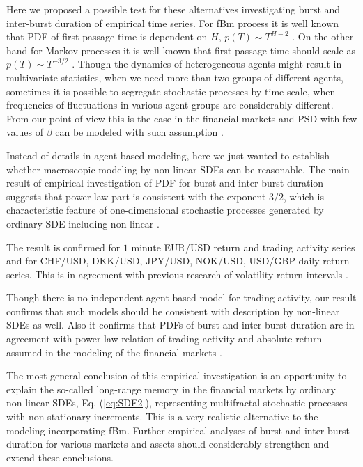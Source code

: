 \documentclass{article}
\begin{document}
Here we proposed a possible test for these alternatives investigating burst and inter-burst duration of empirical time series. For fBm process it is well known that PDF of first passage time is dependent on $H$, $p(T) \sim T^{H-2}$ \cite{Ding1995PhysRevE,Metzler2014Springer}. On the other hand for Markov processes it is well known that first passage time should scale as $p(T) \sim T^{-3/2}$ \cite{Redner2001Cambridge}. Though the dynamics of heterogeneous agents might result in multivariate statistics, when we need more than two groups of different agents, sometimes it is possible to segregate stochastic processes by time scale, when frequencies of fluctuations in various agent groups are considerably different. From our point of view this is the case in the financial markets and PSD with few values of $\beta$ can be modeled with such assumption \cite{Gontis2014PlosOne,Gontis2016PhysA}.

Instead of details in agent-based modeling, here we just wanted to establish whether macroscopic modeling by non-linear SDEs can be reasonable. The main result of empirical investigation of PDF for burst and inter-burst duration suggests that power-law part is consistent with the exponent $3/2$, which is characteristic feature of one-dimensional stochastic processes generated by ordinary SDE including non-linear \cite{Redner2001Cambridge}.

The result is confirmed for $1$ minute EUR/USD return and trading activity series and for CHF/USD, DKK/USD, JPY/USD, NOK/USD, USD/GBP daily return series. This is in agreement with previous research of volatility return intervals \cite{Gontis2016PhysA}.

Though there is no independent agent-based model for trading activity, our result confirms that such models should be consistent with description by non-linear SDEs as well. Also it confirms that PDFs of burst and inter-burst duration are in agreement with  power-law relation of  trading activity and absolute return assumed in the modeling of the financial markets \cite{Gontis2014PlosOne,Gontis2016PhysA}.

The most general conclusion of this empirical investigation is an opportunity to explain the so-called long-range memory in the financial markets by ordinary non-linear SDEs, Eq. (\ref{eq:SDE2}), representing multifractal stochastic processes with non-stationary increments. This is a very realistic alternative to the modeling incorporating fBm. Further empirical analyses of burst and inter-burst duration for various markets and assets should considerably strengthen and extend these conclusions. 
\end{document}
